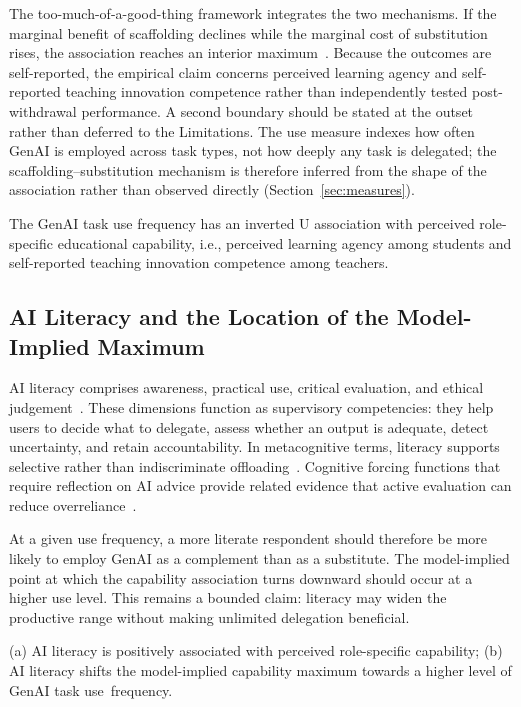 \documentclass[sustainability,article,accept,moreauthors]{Definitions/mdpi}
\begin{document}
The too-much-of-a-good-thing framework integrates the two mechanisms. If the marginal benefit of scaffolding declines while the marginal cost of substitution rises, the association reaches an interior maximum~\cite{pierce2013,haans2016}. Because the outcomes are self-reported, the empirical claim concerns perceived learning agency and self-reported teaching innovation competence rather than independently tested post-withdrawal performance. A second boundary should be stated at the outset rather than deferred to the Limitations. The use measure indexes how often GenAI is employed across task types, not how deeply any task is delegated; the scaffolding--substitution mechanism is therefore inferred from the shape of the association rather than observed directly (Section~\ref{sec:measures}).

\begin{Hypothesis}
The GenAI task use frequency has an inverted U association with perceived role-specific educational capability, i.e., perceived learning agency among students and self-reported teaching innovation competence among teachers.
\end{Hypothesis}

\subsection{AI Literacy and the Location of the Model-Implied Maximum}

AI literacy comprises awareness, practical use, critical evaluation, and ethical judgement~\cite{wang2023}. These dimensions function as supervisory competencies: they help users to decide what to delegate, assess whether an output is adequate, detect uncertainty, and retain accountability. In metacognitive terms, literacy supports selective rather than indiscriminate offloading~\cite{tankelevitch2024}. Cognitive forcing functions that require reflection on AI advice provide related evidence that active evaluation can reduce overreliance~\cite{bucinca2021}.

At a given use frequency, a more literate respondent should therefore be more likely to employ GenAI as a complement than as a substitute. The model-implied point at which the capability association turns downward should occur at a higher use level. This remains a bounded claim: literacy may widen the productive range without making unlimited delegation beneficial.

\begin{Hypothesis}
(a) AI literacy is positively associated with perceived role-specific capability; (b) AI literacy shifts the model-implied capability maximum towards a higher level of GenAI task use~frequency.
\end{Hypothesis}
\end{document}
